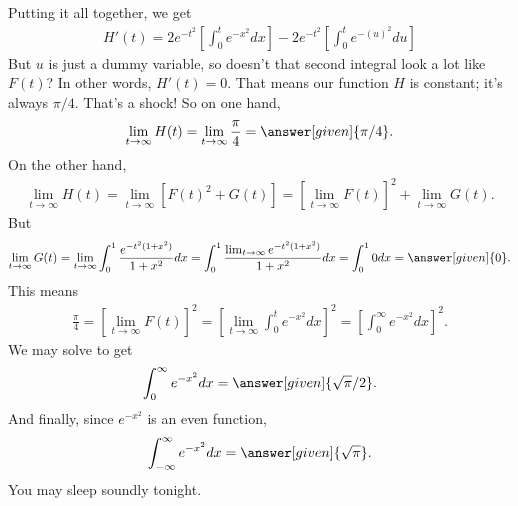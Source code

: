 \documentclass{ximera}
\begin{document}
\begin{exercise}
\begin{exercise}
		\begin{exercise}
			Putting it all together, we get
			\begin{align*}
				H'(t)=2e^{-t^2} \left[ \int_{0}^{t} e^{-x^2}dx \right] -2e^{-t^2} \left[ \int_{0}^{t} e^{-(u)^2}du \right]
			\end{align*}
			But $u$ is just a dummy variable, so doesn't that second integral look a lot like $F(t)$? In other words, $H'(t)=0$. That means our function $H$ is constant; it's always $\pi/4$. That's a shock! So on one hand,
			\begin{align*}
				\lim_{t \to \infty} H(t) = \lim_{t \to \infty} \frac{\pi}{4} = \answer[given]{\pi/4}.
			\end{align*}
			On the other hand,
			\begin{align*}
				\lim_{t \to \infty} H(t) = \lim_{t \to \infty} \left[ F(t)^2+G(t) \right] = \left[\lim_{t \to \infty} F(t) \right]^2 + \lim_{t \to \infty} G(t).
			\end{align*}
			But
			\begin{align*}
				\lim_{t \to \infty} G(t) = \lim_{t \to \infty} \int_{0}^{1} \frac{e^{-t^2(1+x^2)}}{1+x^2} dx = \int_{0}^{1} \frac{ \lim_{t \to \infty} e^{-t^2(1+x^2)}}{1+x^2} dx = \int_{0}^{1} 0 dx = \answer[given]{0}.
			\end{align*}
			This means
			\begin{align*}
				\frac{\pi}{4} = \left[\lim_{t \to \infty} F(t) \right]^2 = \left[\lim_{t \to \infty} \int_{0}^{t} e^{-x^2} dx \right]^2=\left[ \int_{0}^{\infty} e^{-x^2} dx \right]^2.
			\end{align*}
			We may solve to get
			\begin{align*}
				\int_{0}^{\infty} e^{-x^2} dx = \answer[given]{\sqrt{\pi}/2}.
			\end{align*}			
			And finally, since $e^{-x^2}$ is an even function,
			\begin{align*}
				\int_{-\infty}^{\infty} e^{-x^2} dx = \answer[given]{\sqrt{\pi}}.
			\end{align*}
			You may sleep soundly tonight.
		\end{exercise}
	\end{exercise}
\end{exercise}
\end{document}

